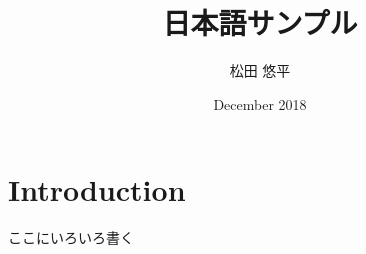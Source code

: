 \documentclass{article}
\title{日本語サンプル}
\author{松田 悠平}
\date{December 2018}
\begin{document}
\maketitle

\section{Introduction}
  ここにいろいろ書く
\end{document}
